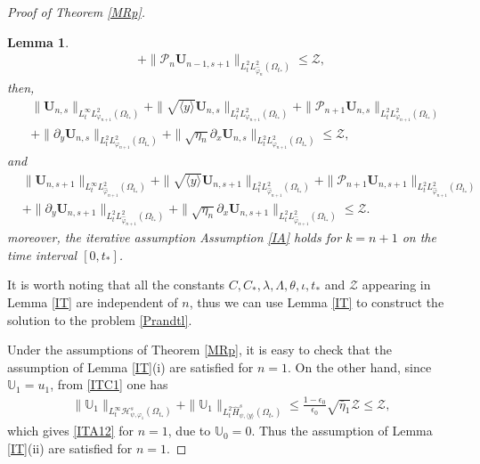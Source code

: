 \documentclass{amsart}
\numberwithin{equation}{section}
\newtheorem{lemma}{Lemma}[section]
\newcommand\y{{{\langle y \rangle}}}
\begin{document}
\begin{proof}[Proof of Theorem \ref{MRp}]
\begin{lemma}
\begin{align}
+\|\mathcal{P}_{n}\mathbf{U}_{n-1,s+1}\|_{L_{t}^{2}L_{\hat{\varphi}_{n}}^{2}(\Omega_{t_{*}})}
\leq \mathcal{Z},\nonumber
\end{align}
then,
\begin{align}\label{ITC2}
&\|\mathbf{U}_{n,s}\|_{L_{t}^{\infty}L_{\varphi_{n+1}}^{2}(\Omega_{t_{*}})}
 +\|\sqrt{\y}\mathbf{U}_{n,s}\|_{L_{t}^{2}L_{\varphi_{n+1}}^{2}(\Omega_{t_{*}})}
 +\|\mathcal{P}_{n+1}\mathbf{U}_{n,s}\|_{L_{t}^{2}L_{\varphi_{n+1}}^{2}(\Omega_{t_{*}})}\\
&+\|\partial_{y}\mathbf{U}_{n,s}\|_{L_{t}^{2}L_{\varphi_{n+1}}^{2}(\Omega_{t_{*}})}
 +\|\sqrt{\eta_{n}}\partial_{x}\mathbf{U}_{n,s}\|_{L_{t}^{2}L_{\varphi_{n+1}}^{2}(\Omega_{t_{*}})}
\leq \mathcal{Z},\nonumber
\end{align}
and
\begin{align}\label{ITC3}
&\|\mathbf{U}_{n,s+1}\|_{L_{t}^{\infty}L_{\hat{\varphi}_{n+1}}^{2}(\Omega_{t_{*}})}
 +\|\sqrt{\y}\mathbf{U}_{n,s+1}\|_{L_{t}^{2}L_{\hat{\varphi}_{n+1}}^{2}(\Omega_{t_{*}})}
 +\|\mathcal{P}_{n+1}\mathbf{U}_{n,s+1}\|_{L_{t}^{2}L_{\hat{\varphi}_{n+1}}^{2}(\Omega_{t_{*}})}\\
&+\|\partial_{y}\mathbf{U}_{n,s+1}\|_{L_{t}^{2}L_{\hat{\varphi}_{n+1}}^{2}(\Omega_{t_{*}})}
 +\|\sqrt{\eta_{n}}\partial_{x}\mathbf{U}_{n,s+1}\|_{L_{t}^{2}L_{\hat{\varphi}_{n+1}}^{2}(\Omega_{t_{*}})}
\leq \mathcal{Z}.\nonumber
\end{align}
moreover, the iterative assumption Assumption \ref{IA} holds for $k=n+1$ on the time interval $[0,t_{*}]$.
\end{lemma}

It is worth noting that all the constants $C, C_{*}, \lambda,\Lambda,\theta,\iota,t_{*}$ and $\mathcal{Z}$ appearing in Lemma \ref{IT} are independent of $n$, thus we can use Lemma \ref{IT} to construct the solution to the problem \eqref{Prandtl}.

Under the assumptions of Theorem \ref{MRp}, it is easy to check that the assumption of Lemma \ref{IT}(i) are satisfied for $n=1$.
On the other hand, since $\mathbb{U}_{1}=u_{1}$, from \eqref{ITC1} one has
\begin{align}
 \|\mathbb{U}_{1}\|_{L_{t}^{\infty}\mathcal{H}_{\psi,\varphi_{1}}^{s}(\Omega_{t_{*}})}
+\|\mathbb{U}_{1}\|_{L_{t}^{2}\hat{H}_{\psi,\y}^{s}(\Omega_{t_{*}})}
\leq \frac{1-\epsilon_{0}}{\epsilon_{0}}\sqrt{\bar{\eta}_{1}}\mathcal{Z}
\leq \mathcal{Z},
\end{align}
which gives \eqref{ITA12} for $n=1$, due to $\mathbb{U}_{0}=0$. Thus the assumption of Lemma \ref{IT}(ii) are satisfied for $n=1$.


\end{proof}
\end{document}
